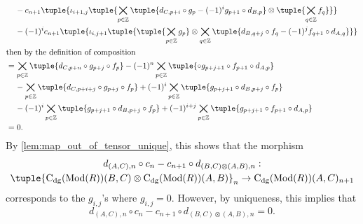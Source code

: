 \begin{remark}
\begin{enumerate}
{\begin{align*}
                &\hspace{0.4cm} - c_{n + 1} \tuple{
                    \iota_{i + 1, j}\tuple{              
                        \bigtimes_{p \in \Zb} \tuple{
                            d_{C, p + i} \circ g_p - (-1)^i g_{p + 1} \circ d_{B, p}
                        } \otimes \tuple{ \bigtimes_{q \in \Zb} f_q }
                    }
                } \\
                &\hspace{0.4cm} - (-1)^i c_{n + 1} \tuple{
                    \iota_{i, j + 1}\tuple{
                        \tuple{ \bigtimes_{p \in \Zb} g_p } \otimes \bigtimes_{q \in \Zb}\tuple{
                            d_{B, q + j} \circ f_q - (-1)^j f_{q + 1} \circ d_{A, q}
                        }
                    }
                } \\
                \intertext{then by the definition of composition}
                &= \bigtimes_{p \in \Zb}\tuple{
                    d_{C, p + n} \circ g_{p + j} \circ f_p
                } - (-1)^n \bigtimes_{p \in \Zb}\tuple{
                    \circ g_{p + j + 1} \circ f_{p + 1} \circ d_{A, p}
                } \\
                &\hspace{0.4cm} - \bigtimes_{p \in \Zb}\tuple{
                    d_{C, p + i + j} \circ g_{p + j} \circ f_p
                } + (-1)^i \bigtimes_{p \in \Zb}\tuple{
                    g_{p + j + 1} \circ d_{B, p + j} \circ f_p
                } \\
                &\hspace{0.4cm} - (-1)^i \bigtimes_{p \in \Zb} \tuple{
                    g_{p + j + 1} \circ d_{B, p + j} \circ f_p
                } + (-1)^{i + j} \bigtimes_{p \in \Zb} \tuple{
                    g_{p + j + 1} \circ f_{p + 1} \circ d_{A, p}
                } \\
                &= 0.
            \end{align*}
            By \autoref{lem:map_out_of_tensor_unique}, this shows that the morphism
            \begin{multline*}
                d_{(A, C), n} \circ c_n - c_{n + 1} \circ d_{(B, C) \otimes (A, B), n}: \\
                \tuple{ \C_{\dg}(\Mod(R))(B, C) \otimes \C_{\dg}(\Mod(R))(A, B) }_n \to \C_{\dg}(\Mod(R))(A, C)_{n + 1}
            \end{multline*}             
            corresponds to the \( g_{i,j} \)'s where \( g_{i, j} = 0 \). However, by uniqueness, this implies that
            \[
                d_{(A, C), n} \circ c_n - c_{n + 1} \circ d_{(B, C) \otimes (A, B), n} = 0.
            \]
        }
    \end{enumerate}
\end{remark}


